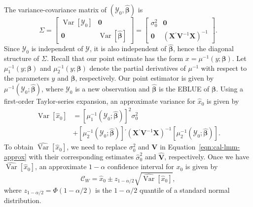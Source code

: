 \documentclass[useAMS,usenatbib,usegraphicx,referee]{biom}\usepackage[]{graphicx}\usepackage[]{color}
\newcommand{\var}{\operatorname{Var}}
\newcommand{\trans}{\ensuremath{^\prime}}
\newcommand{\X}{\ensuremath{\bm{X}}}
\begin{document}
The variance-covariance matrix of $(\mathscr{Y}_0, \widehat{\bm{\beta}})$ is
\[
\Sigma = \begin{bmatrix}
           \var\left[\mathscr{Y}_0\right] & \bm{0} \\
           \bm{0} & \var\left[\widehat{\bm{\beta}}\right]
         \end{bmatrix} = \begin{bmatrix}
           \sigma_0^2 & \bm{0} \\
           \bm{0} & \left(\X\trans\bm{V}^{-1}\X\right)^{-1}
         \end{bmatrix}.
\] 
Since $\mathscr{Y}_0$ is independent of $\bm{\mathscr{Y}}$, it is also independent of $\widehat{\bm{\beta}}$, hence the diagonal structure of $\Sigma$. Recall that our point estimate has the form $x = \mu^{-1}\left(y; \bm{\beta}\right)$. Let $\mu_1^{-1}\left(y; \bm{\beta}\right)$ and $\mu_2^{-1}\left(y; \bm{\beta}\right)$ denote the partial derivatives of $\mu^{-1}$ with respect to the parameters $y$ and $\bm{\beta}$, respectively. Our point estimator is given by $\mu^{-1}(\mathscr{Y}_0; \widehat{\bm{\beta}})$, where $\mathscr{Y}_0$ is a new observation and $\widehat{\bm{\beta}}$ is the EBLUE of $\bm{\beta}$. Using a first-order Taylor-series expansion, an approximate variance for $\widehat{x}_0$ is given by
\begin{align}
  \var\left[\widehat{x}_0\right] &= \left[\mu_1^{-1}\left(\mathscr{Y}_0; \widehat{\bm{\beta}}\right)\right]^2\sigma_0^2 \nonumber \\
   &+ \left[\mu_2^{-1}\left(\mathscr{Y}_0; \widehat{\bm{\beta}}\right)\right]\trans\left(\X\trans\bm{V}^{-1}\X\right)^{-1}\left[\mu_2^{-1}\left(\mathscr{Y}_0; \widehat{\bm{\beta}}\right)\right] \label{eqn:cal-lmm-approx}.
\end{align}
To obtain $\widehat{\var}\left[\widehat{x}_0\right]$, we need to replace $\sigma_0^2$ and $\bm{V}$ in Equation~\eqref{eqn:cal-lmm-approx} with their corresponding estimates $\widehat{\sigma}_0^2$ and $\widehat{\bm{V}}$, respectively. Once we have $\widehat{\var}\left[\widehat{x}_0\right]$, an approximate $1-\alpha$ confidence interval for $x_0$ is given by
\begin{equation}
\label{eqn:wald}
  \mathcal{C}_W = \widehat{x}_0 \pm z_{1-\alpha/2}\sqrt{\widehat{\var}\left[\widehat{x}_0\right]},
\end{equation}
where $z_{1-\alpha/2} = \Phi\left(1-\alpha/2\right)$ is the $1-\alpha/2$ quantile of a standard normal distribution.
\end{document}
